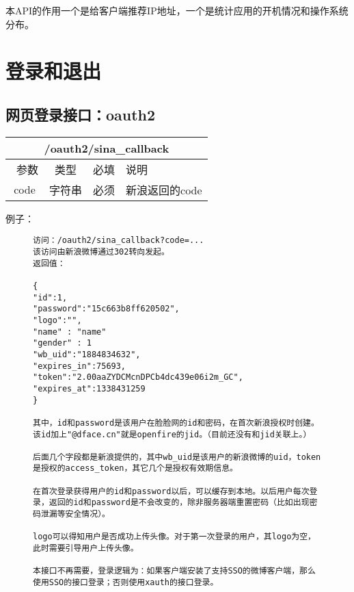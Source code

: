 \documentclass[cs4size]{ctexartutf8}
\begin{document}
本API的作用一个是给客户端推荐IP地址，一个是统计应用的开机情况和操作系统分布。




\section{登录和退出}
\subsection{网页登录接口：oauth2}


\begin{table}[H]
   \begin{center}
\begin{tabular}{|c|c|c|p{12cm}|}
\hline
\multicolumn{4}{|c|}{/oauth2/sina\_callback} \\
\hline\hline
 \  参数  & 类型 & 必填 &  说明  \\
\hline
 code  & 字符串 & 必须 &  新浪返回的code\\
\hline
\end{tabular}
   \end{center}
\end{table}


例子：

\begin{figure}[H]
\begin{verbatim}
访问：/oauth2/sina_callback?code=...
该访问由新浪微博通过302转向发起。
返回值：

{
"id":1,
"password":"15c663b8ff620502",
"logo":"",
"name" : "name"
"gender" : 1
"wb_uid":"1884834632",
"expires_in":75693,
"token":"2.00aaZYDCMcnDPCb4dc439e06i2m_GC",
"expires_at":1338431259
}

其中，id和password是该用户在脸脸网的id和密码，在首次新浪授权时创建。该id加上"@dface.cn"就是openfire的jid。（目前还没有和jid关联上。）

后面几个字段都是新浪提供的，其中wb_uid是该用户的新浪微博的uid，token是授权的access_token，其它几个是授权有效期信息。

在首次登录获得用户的id和password以后，可以缓存到本地。以后用户每次登录，返回的id和password是不会改变的，除非服务器端重置密码（比如出现密码泄漏等安全情况）。

logo可以得知用户是否成功上传头像。对于第一次登录的用户，其logo为空，此时需要引导用户上传头像。

本接口不再需要，登录逻辑为：如果客户端安装了支持SSO的微博客户端，那么使用SSO的接口登录；否则使用xauth的接口登录。


\end{verbatim}
\end{figure}
\end{document}
